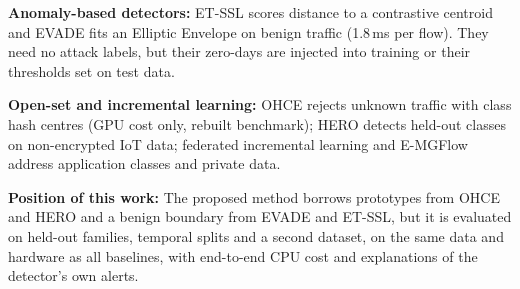 \documentclass[pdflatex,sn-mathphys-num,iicol]{sn-jnl}%
\newcommand{\ms}{\,ms}
\begin{document}
\textbf{Anomaly-based detectors:} ET-SSL \cite{sattar2025etssl} scores distance to a contrastive centroid and EVADE \cite{haynes2025evade} fits an Elliptic Envelope on benign traffic (1.8\ms{} per flow). They need no attack labels, but their zero-days are injected into training or their thresholds set on test data.

\textbf{Open-set and incremental learning:} OHCE \cite{yang2026ohce} rejects unknown traffic with class hash centres (GPU cost only, rebuilt benchmark); HERO \cite{cevallos2025hero} detects held-out classes on non-encrypted IoT data; federated incremental learning \cite{carillo2025fcil} and E-MGFlow \cite{wu2025emgflow} address application classes and private data.

\textbf{Position of this work:} The proposed method borrows prototypes from OHCE and HERO and a benign boundary from EVADE and ET-SSL, but it is evaluated on held-out families, temporal splits and a second dataset, on the same data and hardware as all baselines, with end-to-end CPU cost and explanations of the detector's own alerts.
\end{document}
